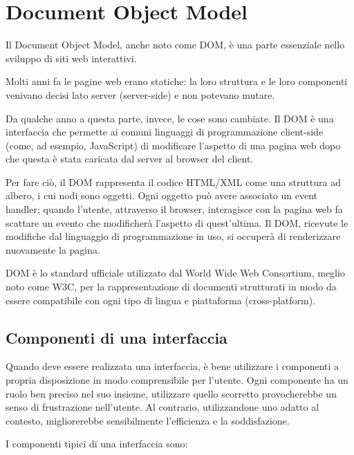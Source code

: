 \section{Document Object Model}

Il Document Object Model, anche noto come DOM, è una parte essenziale nello sviluppo di siti web interattivi.

Molti anni fa le pagine web erano statiche: la loro struttura e le loro componenti venivano decisi lato server (server-side) e non potevano mutare.

Da qualche anno a questa parte, invece, le cose sono cambiate. Il DOM è una interfaccia che permette ai comuni linguaggi di programmazione client-side (come, ad esempio, JavaScript) di modificare l'aspetto di una pagina web dopo che questa è stata caricata dal server al browser del client.

Per fare ciò, il DOM rappresenta il codice HTML/XML come una struttura ad albero, i cui nodi sono oggetti. Ogni oggetto può avere associato un event handler: quando l'utente, attraverso il browser, interagisce con la pagina web fa scattare un evento che modificherà l'aspetto di quest'ultima. Il DOM, ricevute le modifiche dal linguaggio di programmazione in uso, si occuperà di renderizzare nuovamente la pagina.

DOM è lo standard ufficiale utilizzato dal World Wide Web Consortium, meglio noto come W3C, per la rappresentazione di documenti strutturati in modo da essere compatibile con ogni tipo di lingua e piattaforma (cross-platform).

\subsection{Componenti di una interfaccia}

Quando deve essere realizzata una interfaccia, è bene utilizzare i componenti a propria disposizione in modo comprensibile per l'utente. Ogni componente ha un ruolo ben preciso nel suo insieme, utilizzare quello scorretto provocherebbe un senso di frustrazione nell'utente. Al contrario, utilizzandone uno adatto al contesto, migliorerebbe sensibilmente l'efficienza e la soddisfazione.

I componenti tipici di una interfaccia sono:

